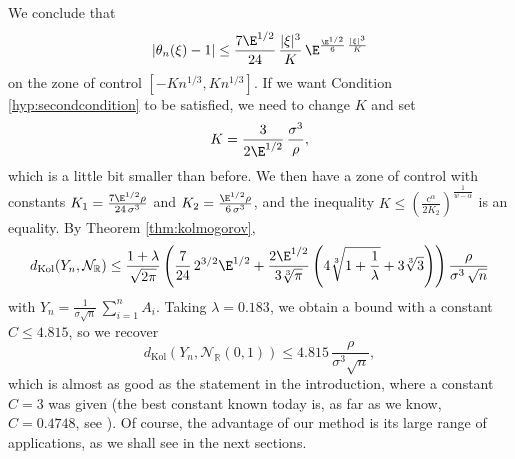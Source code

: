 \documentclass[envcountsame]{svmult}
\newcommand{\R}{\mathbb{R}}
\newcommand{\dkol}{d_\mathrm{Kol}}
\newcommand{\gauss}{\mathcal{N}_{\R}(0,1)}
\begin{document}
We conclude that
\begin{align*}
|\theta_n(\xi)-1| \leq \frac{7\E^{1/2}}{24}\,\frac{|\xi|^3}{K} \,\E^{\frac{\E^{1/2}}{6}\, \frac{|\xi|^3}{K}}
\end{align*}
on the zone of control $[-Kn^{1/3},Kn^{1/3}]$. If we want Condition \ref{hyp:secondcondition} to be satisfied, we need to change $K$ and set
$$K = \frac{3}{2\E^{1/2}}\,\frac{\sigma^3}{\rho},$$
which is a little bit smaller than before. We then have a zone of control with constants $K_1 = \frac{7\E^{1/2}\rho}{24\,\sigma^3}$ and $K_2 = \frac{\E^{1/2}\rho}{6\,\sigma^3}$, and the inequality $K \leq (\frac{c^\alpha}{2K_2})^{\frac{1}{w-\alpha}}$ is an equality. By Theorem \ref{thm:kolmogorov},
$$\dkol(Y_n,\mathcal{N}_\R) \leq \frac{1+\lambda}{\sqrt{2\pi}}\left(\frac{7}{24}\,2^{3/2}\E^{1/2} + \frac{2\E^{1/2}}{3\sqrt[3]{\pi} }\left(4\sqrt[3]{1+\frac{1}{\lambda}}+3\sqrt[3]{3}\right)\right) \frac{\rho}{\sigma^3\,\sqrt{n}}$$
with $Y_n = \frac{1}{\sigma \sqrt{n}}\,\sum_{i=1}^n A_i$. Taking $\lambda=0.183$, we obtain a bound with a constant $C\leq 4.815$, so we recover
$$\dkol(Y_n,\gauss) \leq 4.815\,\frac{\rho}{\sigma^3\sqrt{n}},$$
which is almost as good as the statement in the introduction, where a constant $C=3$ was given (the best constant known today is, as far as we know, $C=0.4748$, see \cite{KS10}). 
Of course, the advantage of our method is its large range of applications,
as we shall see in the next sections.\medskip
\end{document}
